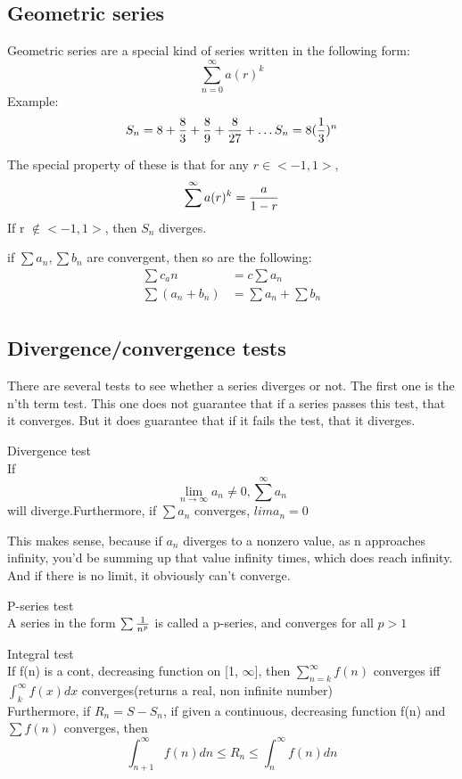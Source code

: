 \documentclass[17pt]{extarticle} %
\begin{document}
\subsection{Geometric series}
Geometric series are a special kind of series written in the following form:
$$
\sum^\infty_{n=0} a(r)^k
$$
Example: 
$$
S_n = 8 + {8 \over 3} + {8 \over 9} + {8 \over 27} + \ldots \\
S_n = 8 ({1\over 3})^n
$$

The special property of these is that for any $r \in <-1, 1>$, 
$$
\sum^\infty a(r)^k = {a \over 1 - r}
$$
If r $\not\in <-1, 1>$, then $S_n$ diverges.

\begin{theorem*}   
    if $\sum a_n, \sum b_n$ are convergent, then so are the following:
    $$
    \begin{aligned}
        \sum c_an &= c \sum a_n \\
        \sum \left( a_n + b_n \right) &= \sum a_n + \sum b_n \\
    \end{aligned}
    $$
\end{theorem*} 

\subsection{Divergence/convergence tests}
There are several tests to see whether a series diverges or not. 
The first one is the n'th term test. This one does not guarantee that if a series passes this test, that it converges.
But it does guarantee that if it fails the test, that it diverges.

\begin{theorem*}{Divergence test} \\
    If
    $$
    \lim_{n \to \infty} a_n \neq 0, 
     \sum^\infty a_n 
    $$ 
    will diverge.Furthermore, if $\sum a_n$ converges, $lim a_n = 0$
\end{theorem*}
This makes sense, because if $a_n$ diverges to a nonzero value, as n approaches infinity, you'd be summing up that value infinity times, 
which does reach infinity. And if there is no limit, it obviously can't converge.

\begin{theorem*}{P-series test}\\
    A series in the form $\sum {1\over n^p}$ is called a p-series, and converges for all $p > 1$
\end{theorem*}

\begin{theorem*}{Integral test}\\
    If f(n) is a cont, decreasing function on [1, $\infty$], then $\sum^\infty_{n=k} f(n)$ converges 
    iff $\int_k^\infty f(x)dx$ converges(returns a real, non infinite number)\\
    Furthermore, if $R_n = S - S_n$, 
if given a continuous, decreasing function f(n) and $\sum f(n)$ converges, 
then 
$$
\int^\infty_{n+1} f(n) dn \leq R_n \leq \int^\infty_n f(n) dn
$$ 
    
\end{theorem*}
\end{document}
